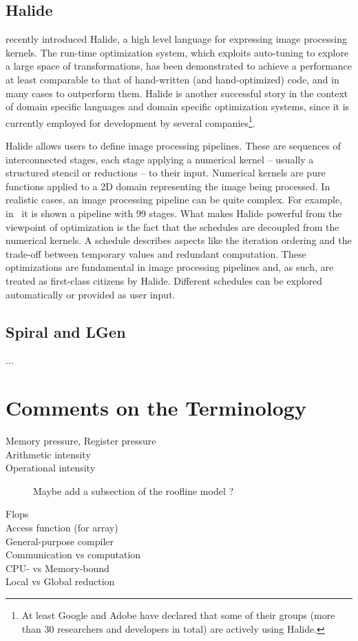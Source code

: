 \subsection{Halide}
\cite{halide} recently introduced Halide, a high level language for expressing image processing kernels. The run-time optimization system, which exploits auto-tuning to explore a large space of transformations, has been demonstrated to achieve a performance at least comparable to that of hand-written (and hand-optimized) code, and in many cases to outperform them. Halide is another successful story in the context of domain specific languages and domain specific optimization systems, since it is currently employed for development by several companies\footnote{At least Google and Adobe have declared that some of their groups (more than 30 researchers and developers in total) are actively using Halide.}.

Halide allows users to define image processing pipelines. These are sequences of interconnected stages, each stage applying a numerical kernel -- usually a structured stencil or reductions -- to their input. Numerical kernels are pure functions applied to a 2D domain representing the image being processed. In realistic cases, an image processing pipeline can be quite complex. For example, in~\cite{halide-locallaplacian} it is shown a pipeline with 99 stages. What makes Halide powerful from the viewpoint of optimization is the fact that the schedules are decoupled from the numerical kernels. A schedule describes aspects like the iteration ordering and the trade-off between temporary values and redundant computation. These optimizations are fundamental in image processing pipelines and, as such, are treated as first-class citizens by Halide. Different schedules can be explored automatically or provided as user input.


\subsection{Spiral and LGen}
...


\section{Comments on the Terminology}
\label{sec:bkg:terminology}

\begin{description}
\item[Memory pressure, Register pressure]
\item[Arithmetic intensity]
\item[Operational intensity] Maybe add a subsection of the roofline model ?
\item[Flops]
\item[Access function (for array)]
\item[General-purpose compiler]
\item[Communication vs computation]
\item[CPU- vs Memory-bound]
\item[Local vs Global reduction]
\end{description}
